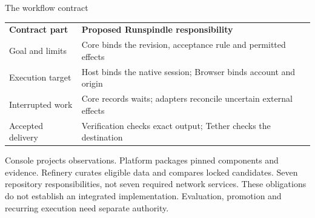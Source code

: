 \begin{frame}[label=argument-mechanism]{The workflow contract}
\begin{tabular}{p{.25\linewidth}p{.66\linewidth}}
\textbf{Contract part} & \textbf{Proposed Runspindle responsibility} \\
Goal and limits & Core binds the revision, acceptance rule and permitted effects \\
Execution target & Host binds the native session; Browser binds account and origin \\
Interrupted work & Core records waits; adapters reconcile uncertain external effects \\
Accepted delivery & Verification checks exact output; Tether checks the destination \\
\end{tabular}
\par\medskip
Console projects observations. Platform packages pinned components and evidence.
Refinery curates eligible data and compares locked candidates.
\vfill
{\footnotesize Seven repository responsibilities, not seven required network
services. These obligations do not establish an integrated implementation.
Evaluation, promotion and recurring execution need separate authority.}
\end{frame}
